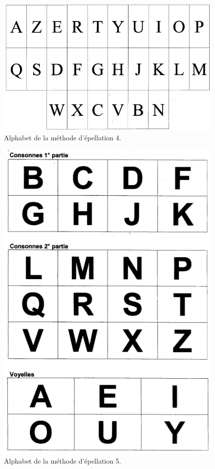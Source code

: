 \documentclass[twoside,twocolumn]{article}
\begin{document}
\begin{center}
\begin{figure}[h!]
  \includegraphics[scale=0.23]{methode4.png}
  \caption{Alphabet de la méthode d'épellation 4.}
  \label{maxi}
\end{figure}
\end{center}

\begin{center}
\begin{figure}[h!]
  \includegraphics[scale=0.35]{methode5.png}
  \caption{Alphabet de la méthode d'épellation 5.}
  \label{maxi}
\end{figure}
\end{center}
\end{document}
